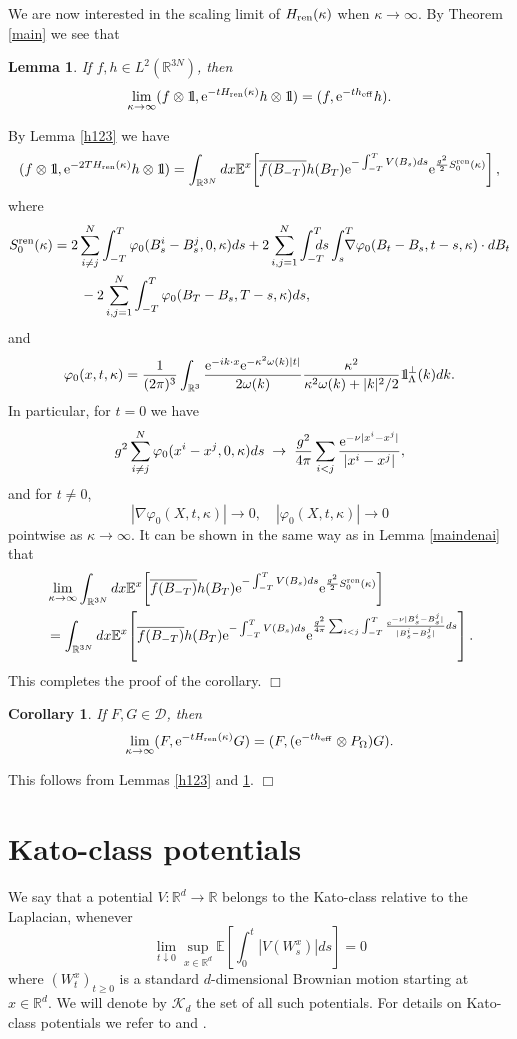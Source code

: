 \documentclass[12pt]{article}
\newtheorem{lemma}[theorem]{Lemma}
\newtheorem{corollary}[theorem]{Corollary}
\providecommand{\bc}[1]{\begin{corollary}\label{#1}}
\providecommand{\ec}{\end{corollary}}
\newcommand{\bl}[1]{\begin{lemma}\label{#1}}
\newcommand{\el}{\end{lemma}}
\def\bbbone{{\mathchoice {\rm 1\mskip-4mu l} {\rm 1\mskip-4mu l}
{\rm 1\mskip-4.5mu l} {\rm 1\mskip-5mu l}}}
\def\one{\bbbone}
\newcommand{\kp}{\one_\Lambda^\perp(k)}
\newcommand{\Ebb}{{\mathbb E}}
\providecommand{\eq}[1]{\begin{equation}\label{#1}}
\providecommand{\en}{\end{equation}}
\providecommand{\qed}{\hfill {$\Box$}\par\medskip}
\providecommand{\BR}{{\mathbb{R}^3 }}
\providecommand{\BRN}{{\mathbb{R}^{3N} }}
\providecommand{\iijj}{\sum_{i,j=1}^N}
\renewcommand{\ij}{\sum_{i\not=j}^N}
\providecommand{\RR}{\mathbb{R}}
\providecommand{\ms}[1]{\mathscr{#1}}
\providecommand{\ov}[1]{\overline{#1}}
\providecommand{\non}{\nonumber}
\providecommand{\e}{{\rm e}}
\providecommand{\1}{\mathbb{1}}
\providecommand{\ren}{{\rm ren}}
\begin{document}
We are now interested in the scaling limit of $H_{\ren}(\kappa)$ when $\kappa\to\infty$. By Theorem
\ref{main} we see that
\bl{main4}
If $f,h\in L^2(\BRN)$, then
\eq{weakcouplinglimit}
\lim_{\kappa\to\infty}(f\otimes \one, \e^{-t H_\ren (\kappa)}h\otimes \one) =(f,\e^{-t h_{\rm eff}} h).
\en
\el
\proof
By Lemma \ref{h123} we have
\eq{sasa2121}
(f\otimes \one, \e^{-2T H_\ren (\kappa)}h\otimes \one) =\int_{\BRN} dx
\Ebb^x \! \left[\ov{f(B_{-T})} h(B_T)\e^{-\int_{-T}^T V(B_s) ds} \e^{\frac{g^2}{2} S_0^\ren (\kappa)}\right],
\en
where
\begin{align}\label{hiro}
S_0^\ren (\kappa)
&
= 2\ij\int_{-T}^T \varphi_0(B_s^i-B_s^j,0,\kappa)ds
+2\iijj \int_{-T}^T \!\!\!\!\!
ds\int_s^T
\!\!\!\!\!  \nabla\varphi_0(B_t-B_s,t-s,\kappa) \cdot dB_t\non\\
&
\qquad -2\iijj \int_{-T}^T \varphi_0(B_T-B_s,T-s,\kappa)ds,
\end{align}
and
\eq{sasa33}
\varphi_0(x,t,\kappa)=\frac{1}{(2\pi)^3}\int_{\BR} \frac{\e^{-ik\cdot x} \e^{-\kappa^2\omega(k)|t|}}{2\omega(k)}
\frac{\kappa^2}{\kappa^2 \omega(k)+|k|^2/2}  \kp dk.
\en
In particular, for $t=0$ we have
$$
g^2\ij \varphi_0(x^i-x^j,0,\kappa)ds \;\to\; \frac{g^2}{4\pi} \sum_{i<j}\frac{\e^{-\nu|x^i-x^j|}} {|x^i-x^j|},
$$
and for $t\not=0$,
$$
|\nabla\varphi_0(X, t, \kappa)|\to 0, \quad |\varphi_0(X, t, \kappa)|\to 0
$$
pointwise as $\kappa\to\infty$. It can be shown in the same way as in Lemma \ref{maindenai} that
\begin{align*}
&
\lim_{\kappa\to\infty} \int_{\BRN} dx
\Ebb^x \! \left[\ov{f(B_{-T})} h(B_T)\e^{-\int_{-T}^T V(B_s) ds} \e^{\frac{g^2}{2} S_0^\ren (\kappa)}\right]\\
&=
\int_{\BRN} dx \Ebb^x\!\left[\ov{f(B_{-T})} h(B_T)\e^{-\int_{-T}^T V(B_s) ds} \e^{\frac{g^2}{4\pi}
\sum_{i<j} \int_{-T}^T \frac{\e^{-\nu|B^i_s-B^j_s|}} {|B^i_s-B^j_s|}ds} \right].
\end{align*}
This completes the proof of the corollary.
\qed
\bc{main5}
If $F, G\in\ms D$, then
\eq{weakcouplinglimit2}
\lim_{\kappa\to\infty}(F,  \e^{-t H_\ren (\kappa)} G) = (F,(\e^{-t h_{\rm eff}}\otimes P_\Omega)  G).
\en
\ec
\proof
This follows from Lemmas \ref{h123} and  \ref{main4}.
\qed


\appendix
\section{Kato-class potentials}
\label{appa}
We say that a potential $V: \RR^d \to \RR$ belongs to the Kato-class relative to the Laplacian, whenever
\eq{kato2}
\lim_{t\downarrow 0}\sup_{x\in\RR^d} \Ebb \!\left [\int_0^t |V(W^x_s)|ds\right ]=0
\en
where $(W^x_t)_{t\ge 0}$ is a standard $d$-dimensional Brownian motion starting at $x\in\RR^d$.
We will denote by $\ms K_d$ the set of all such potentials.  For details
on Kato-class potentials we refer to \cite[Chapter 3.3]{lhb11} and \cite{as82, cfks08}.
\end{document}
